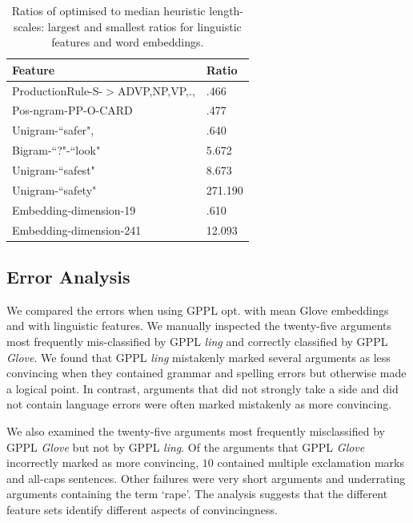 \begin{table}
\small
  \begin{tabularx}{\columnwidth}{l | X }
  Feature & Ratio\\
  \hline
  ProductionRule-S-$>$ADVP,NP,VP,., & .466 \nonumber\\
  Pos-ngram-PP-O-CARD & .477 \nonumber\\
  Unigram-``safer", & .640 \nonumber\\
  \hline
  Bigram-``?"-``look" & 5.672 \nonumber\\
  Unigram-``safest" & 8.673 \nonumber\\
  Unigram-``safety" & 271.190 \nonumber\\
  \hline
  Embedding-dimension-19 & .610 \nonumber\\
  \hline
  Embedding-dimension-241 & 12.093 \nonumber\\
  \end{tabularx}
  \caption{Ratios of optimised to median heuristic length-scales: largest and smallest
  ratios for linguistic features and word embeddings.}
  \label{tab:extreme_features}
\end{table}


\subsection{Error Analysis}

We compared the errors when using GPPL opt. with mean Glove embeddings
and with linguistic features. We
manually inspected the twenty-five arguments most frequently
mis-classified by GPPL \emph{ling} and correctly classified by GPPL \emph{Glove}.
We found that GPPL \emph{ling} mistakenly marked several arguments 
as less convincing when they contained grammar and spelling errors but otherwise
made a logical point. 
In contrast, arguments that did not strongly take a side and did not contain 
language errors were often marked mistakenly as more convincing.

We also examined the twenty-five arguments most frequently misclassified by GPPL \emph{Glove} but not by GPPL \emph{ling}.
Of the arguments that GPPL \emph{Glove} incorrectly marked as more convincing, 
$10$ contained multiple exclamation marks and all-caps sentences. 
Other failures were very short arguments and underrating arguments containing the term `rape'.
The analysis suggests that the different feature sets identify different aspects of convincingness.


